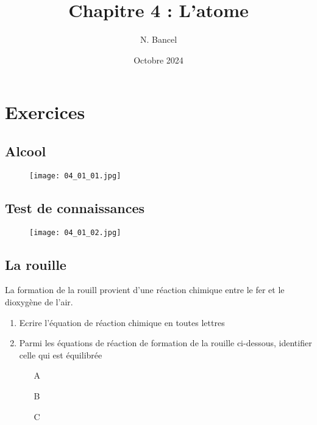\documentclass[a4paper,12pt]{article}
\begin{document}
\title{Chapitre 4 : L'atome}
\author{N. Bancel}
\date{Octobre 2024}
\maketitle

\section{Exercices}

\subsection{Alcool}


\begin{figure}[H]
  \centering
  \texttt{[image: 04\_01\_01.jpg]}
\end{figure}

\subsection{Test de connaissances}


\begin{figure}[H]
  \centering
  \texttt{[image: 04\_01\_02.jpg]}
\end{figure}

\subsection{La rouille}

La formation de la rouill provient d'une réaction chimique entre le fer et le dioxygène de l'air.

\begin{enumerate}

 \item Ecrire l'équation de réaction chimique en toutes lettres
 \item Parmi les équations de réaction de formation de la rouille ci-dessous, identifier celle qui est équilibrée 
 
 \begin{itemize}[noitemsep]
  \item[A] 
  \item[B] 
  \item[C] 
 \end{itemize}

\end{enumerate}
\end{document}
